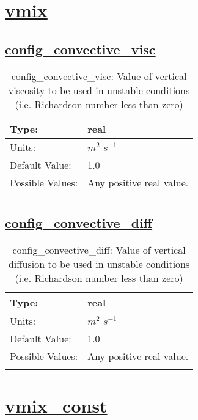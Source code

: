 \section[vmix]{\hyperref[sec:nm_tab_vmix]{vmix}}
\label{sec:nm_sec_vmix}
\subsection[config\_convective\_visc]{\hyperref[sec:nm_tab_vmix]{config\_convective\_visc}}
\label{subsec:nm_sec_config_convective_visc}
\begin{center}
\begin{longtable}{| p{2.0in} | p{4.0in} |}
    \hline
    Type: & real \\
    \hline
    Units: & $m^2$ $s^{-1}$ \\
    \hline
    Default Value: & 1.0 \\
    \hline
    Possible Values: & Any positive real value. \\
    \hline
    \caption{config\_convective\_visc: Value of vertical viscosity to be used in unstable conditions (i.e. Richardson number less than zero)}
\end{longtable}
\end{center}
\subsection[config\_convective\_diff]{\hyperref[sec:nm_tab_vmix]{config\_convective\_diff}}
\label{subsec:nm_sec_config_convective_diff}
\begin{center}
\begin{longtable}{| p{2.0in} | p{4.0in} |}
    \hline
    Type: & real \\
    \hline
    Units: & $m^2$ $s^{-1}$ \\
    \hline
    Default Value: & 1.0 \\
    \hline
    Possible Values: & Any positive real value. \\
    \hline
    \caption{config\_convective\_diff: Value of vertical diffusion to be used in unstable conditions (i.e. Richardson number less than zero)}
\end{longtable}
\end{center}
\section[vmix\_const]{\hyperref[sec:nm_tab_vmix_const]{vmix\_const}}
\label{sec:nm_sec_vmix_const}
